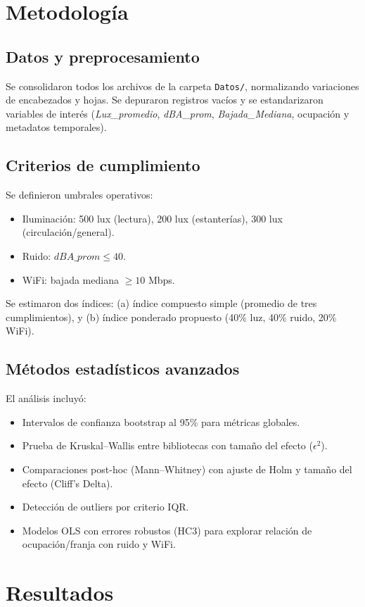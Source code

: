 \documentclass[12pt,a4paper]{article}
\begin{document}
\section{Metodología}
\subsection{Datos y preprocesamiento}
Se consolidaron todos los archivos de la carpeta \texttt{Datos/}, normalizando variaciones de encabezados y hojas. Se depuraron registros vacíos y se estandarizaron variables de interés (\textit{Lux\_promedio}, \textit{dBA\_prom}, \textit{Bajada\_Mediana}, ocupación y metadatos temporales).

\subsection{Criterios de cumplimiento}
Se definieron umbrales operativos:
\begin{itemize}
    \item Iluminación: 500 lux (lectura), 200 lux (estanterías), 300 lux (circulación/general).
    \item Ruido: $dBA\_prom \leq 40$.
    \item WiFi: bajada mediana $\geq 10$ Mbps.
\end{itemize}
Se estimaron dos índices: (a) índice compuesto simple (promedio de tres cumplimientos), y (b) índice ponderado propuesto (40\% luz, 40\% ruido, 20\% WiFi).

\subsection{Métodos estadísticos avanzados}
El análisis incluyó:
\begin{itemize}
    \item Intervalos de confianza bootstrap al 95\% para métricas globales.
    \item Prueba de Kruskal--Wallis entre bibliotecas con tamaño del efecto ($\epsilon^2$).
    \item Comparaciones post-hoc (Mann--Whitney) con ajuste de Holm y tamaño del efecto (Cliff's Delta).
    \item Detección de outliers por criterio IQR.
    \item Modelos OLS con errores robustos (HC3) para explorar relación de ocupación/franja con ruido y WiFi.
\end{itemize}

\section{Resultados}
\end{document}
